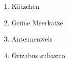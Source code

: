 \documentclass{scrartcl}
\begin{document}
\begin{enumerate}
    \item Kätzchen
    \item Grüne Meerkatze
    \item Antennenwels
    \item Orizabus subaziro %
\end{enumerate}
\end{document}
